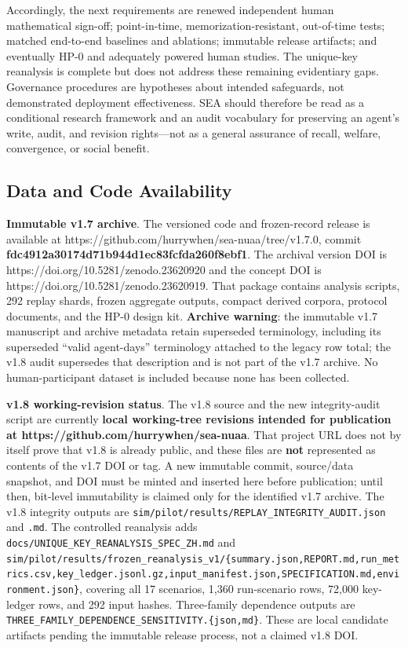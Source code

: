 \documentclass[
  11pt]{article}
\begin{document}
Accordingly, the next requirements are renewed independent human
mathematical sign-off; point-in-time, memorization-resistant,
out-of-time tests; matched end-to-end baselines and ablations; immutable
release artifacts; and eventually HP-0 and adequately powered human
studies. The unique-key reanalysis is complete but does not address
these remaining evidentiary gaps. Governance procedures are hypotheses
about intended safeguards, not demonstrated deployment effectiveness.
SEA should therefore be read as a conditional research framework and an
audit vocabulary for preserving an agent's write, audit, and revision
rights---not as a general assurance of recall, welfare, convergence, or
social benefit.

\subsection{Data and Code
Availability}\label{data-and-code-availability}

\textbf{Immutable v1.7 archive}. The versioned code and frozen-record
release is available at
https://github.com/hurrywhen/sea-nuaa/tree/v1.7.0, commit
\textbf{fdc4912a30174d71b944d1ec83fcfda260f8ebf1}. The archival version
DOI is https://doi.org/10.5281/zenodo.23620920 and the concept DOI is
https://doi.org/10.5281/zenodo.23620919. That package contains analysis
scripts, 292 replay shards, frozen aggregate outputs, compact derived
corpora, protocol documents, and the HP-0 design kit. \textbf{Archive
warning}: the immutable v1.7 manuscript and archive metadata retain
superseded terminology, including its superseded ``valid agent-days''
terminology attached to the legacy row total; the v1.8 audit supersedes
that description and is not part of the v1.7 archive. No
human-participant dataset is included because none has been collected.

\textbf{v1.8 working-revision status}. The v1.8 source and the new
integrity-audit script are currently \textbf{local working-tree
revisions intended for publication at
https://github.com/hurrywhen/sea-nuaa}. That project URL does not by
itself prove that v1.8 is already public, and these files are
\textbf{not} represented as contents of the v1.7 DOI or tag. A new
immutable commit, source/data snapshot, and DOI must be minted and
inserted here before publication; until then, bit-level immutability is
claimed only for the identified v1.7 archive. The v1.8 integrity outputs
are \texttt{sim/pilot/results/REPLAY\_INTEGRITY\_AUDIT.json} and
\texttt{.md}. The controlled reanalysis adds
\texttt{docs/UNIQUE\_KEY\_REANALYSIS\_SPEC\_ZH.md} and
\texttt{sim/pilot/results/frozen\_reanalysis\_v1/\{summary.json,REPORT.md,run\_metrics.csv,key\_ledger.jsonl.gz,input\_manifest.json,SPECIFICATION.md,environment.json\}},
covering all 17 scenarios, 1,360 run-scenario rows, 72,000 key-ledger
rows, and 292 input hashes. Three-family dependence outputs are
\texttt{THREE\_FAMILY\_DEPENDENCE\_SENSITIVITY.\{json,md\}}. These are
local candidate artifacts pending the immutable release process, not a
claimed v1.8 DOI.
\end{document}

